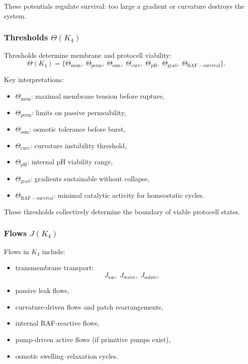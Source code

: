 These potentials regulate survival: too large a gradient or curvature
destroys the system.

\subsubsection{Thresholds \texorpdfstring{$\Theta(K_4)$}{\Theta(K_4)}}

Thresholds determine membrane and protocell viability:
\[
\Theta(K_4) =
\{\Theta_{\mathrm{mem}},\;
  \Theta_{\mathrm{perm}},\;
  \Theta_{\mathrm{osm}},\;
  \Theta_{\mathrm{curv}},\;
  \Theta_{\mathrm{pH}},\;
  \Theta_{\mathrm{grad}},\;
  \Theta_{\mathrm{RAF-survival}}\}.
\]

Key interpretations:
\begin{itemize}
    \item $\Theta_{\mathrm{mem}}$: maximal membrane tension before
          rupture,
    \item $\Theta_{\mathrm{perm}}$: limits on passive permeability,
    \item $\Theta_{\mathrm{osm}}$: osmotic tolerance before burst,
    \item $\Theta_{\mathrm{curv}}$: curvature instability threshold,
    \item $\Theta_{\mathrm{pH}}$: internal pH viability range,
    \item $\Theta_{\mathrm{grad}}$: gradients sustainable without
          collapse,
    \item $\Theta_{\mathrm{RAF-survival}}$: minimal catalytic activity
          for homeostatic cycles.
\end{itemize}

These thresholds collectively determine the boundary of viable protocell
states.

\subsubsection{Flows \texorpdfstring{$J(K_4)$}{J(K_4)}}

Flows in $K_4$ include:
\begin{itemize}
    \item transmembrane transport:
          \[
          J_{\mathrm{ion}},\; J_{\mathrm{water}},\; J_{\mathrm{solute}},
          \]
    \item passive leak flows,
    \item curvature-driven flows and patch rearrangements,
    \item internal RAF-reactive flows,
    \item pump-driven active flows (if primitive pumps exist),
    \item osmotic swelling–relaxation cycles.
\end{itemize}

